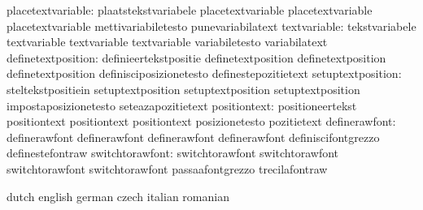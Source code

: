                placetextvariable: plaatstekstvariabele             placetextvariable
                                  placetextvariable                placetextvariable
                                  mettivariabiletesto              punevariabilatext
                    textvariable: tekstvariabele                   textvariable
                                  textvariable                     textvariable
                                  variabiletesto                   variabilatext
              definetextposition: definieertekstpositie            definetextposition
                                  definetextposition               definetextposition
                                  definisciposizionetesto          definestepozitietext
               setuptextposition: steltekstpositiein               setuptextposition
                                  setuptextposition                setuptextposition
                                  impostaposizionetesto            seteazapozitietext
                    positiontext: positioneertekst                 positiontext
                                  positiontext                     positiontext
                                  posizionetesto                   pozitietext %
                   definerawfont: definerawfont                    definerawfont
                                  definerawfont                    definerawfont
                                  definiscifontgrezzo              definestefontraw
                 switchtorawfont: switchtorawfont                  switchtorawfont
                                  switchtorawfont                  switchtorawfont
                                  passaafontgrezzo                 trecilafontraw
\stopcommands





\startcommands                    dutch                            english
                                  german                           czech
                                  italian                          romanian

